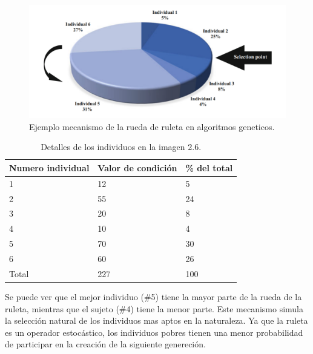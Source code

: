 \documentclass[12pt,letterpaper]{report}
\begin{document}
\begin{figure}[!htb]
    \centering
    \includegraphics[width=\textwidth]{Img_C2_2.2/FIG_1.png} 
    \caption{Ejemplo mecanismo de la rueda de ruleta en algoritmos geneticos.}
    \label{fig:fig6}
\end{figure}


\begin{table}[h!]
  \centering
  \begin{adjustbox}{width=.75\textwidth}
  \begin{tabular}{|l|l|l|}
\hline
Numero individual & Valor de condición & \% del total \\ \hline
1                 & 12                 & 5            \\ \hline
2                 & 55                 & 24           \\ \hline
3                 & 20                 & 8            \\ \hline
4                 & 10                 & 4            \\ \hline
5                 & 70                 & 30           \\ \hline
6                 & 60                 & 26           \\ \hline
Total             & 227                & 100          \\ \hline
\end{tabular}  
  \end{adjustbox}
  \caption{Detalles de los individuos en la imagen 2.6.}
  \label{table:tab1}
\end{table}

\pagebreak
Se puede ver que el mejor individuo (\#5) tiene la mayor parte de la rueda de la ruleta, mientras que el sujeto (\#4) tiene la menor parte. Este mecanismo simula la selección natural de los individuos mas aptos en la naturaleza. Ya que la ruleta es un operador estocástico, los individuos pobres tienen una menor probabilidad de participar en la creación de la siguiente genereción.
\\
\end{document}
